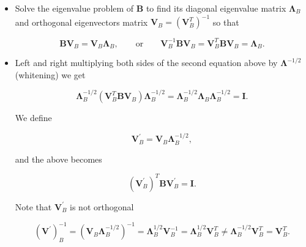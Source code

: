 \documentclass[10pt,b5paper,titlepage]{book}
\begin{document}
\begin{itemize}
    \item Solve the eigenvalue problem of $\mathbf{B}$ to find its diagonal
        eigenvalue matrix $\mathbf{\Lambda}_{B}$ and orthogonal eigenvectors
        matrix $\mathbf{V}_{B} = (\mathbf{V}_{B}^{T})^{-1}$ so that

        \begin{equation}
            \mathbf{B}\mathbf{V}_{B} = \mathbf{V}_{B}\mathbf{\Lambda}_{B},
            \qquad \text{or} \qquad
            \mathbf{V}_{B}^{-1}\mathbf{B}\mathbf{V}_{B}
            = \mathbf{V}_{B}^{T}\mathbf{B}\mathbf{V}_{B} = \mathbf{\Lambda}_{B}
        .\end{equation}

    \item Left and right multiplying both sides of the second equation above by
        $\mathbf{\Lambda}^{-1 / 2}$ (whitening) we get

        \begin{equation}
            \mathbf{\Lambda}_{B}^{-1 / 2} (\mathbf{V}_{B}^{T}\mathbf{B}\mathbf{V}_{B})
            \mathbf{\Lambda}_{B}^{-1 / 2}
            = \mathbf{\Lambda}_{B}^{-1 / 2}\mathbf{\Lambda}_{B}\mathbf{\Lambda}_{B}^{-1 / 2}
            = \mathbf{I}
        .\end{equation}

        We define

        \begin{equation}
            \mathbf{V}_{B}^{'} = \mathbf{V}_{B}\mathbf{\Lambda}_{B}^{-1 / 2}
        ,\end{equation}

        and the above becomes

        \begin{equation}
            (\mathbf{V}_{B}^{'})^{T} \mathbf{B} \mathbf{V}_{B}^{'} = \mathbf{I}
        .\end{equation}

        Note that $\mathbf{V}_{B}^{'}$ is not orthogonal

        \begin{equation}
            (\mathbf{V^{'}})_{B}^{-1}
            = (\mathbf{V}_{B}\mathbf{\Lambda}_{B}^{-1 / 2})^{-1}
            = \mathbf{\Lambda}_{B}^{1 / 2}\mathbf{V}_{B}^{-1}
            = \mathbf{\Lambda}_{B}^{1 / 2}\mathbf{V}_{B}^{T}
            \neq \mathbf{\Lambda}_{B}^{-1 / 2} \mathbf{V}_{B}^{T} = \mathbf{V}_{B}^{T}
        .\end{equation}


\end{itemize}
\end{document}
